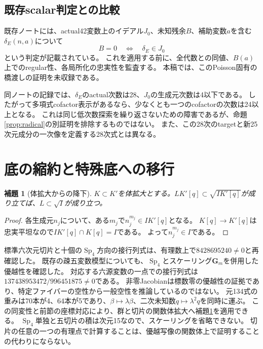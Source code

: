 \documentclass[a4paper,11pt]{ltjsarticle}
\newtheorem{lemma}[proposition]{補題}
\theoremstyle{definition}
\newcommand{\Sp}{\operatorname{Sp}}
\begin{document}
\subsection{既存scalar判定との比較}
既存ノートには、actual42変数上のイデアル\(J_0\)、未知残余\(B\)、補助変数\(a\)を含む\(\delta_E(n,a)\)について
\[
 B=0\quad\Longleftrightarrow\quad\delta_E\in J_0
\]
という判定が記載されている。
これを適用する前に、全代数との同値、\(B(a)\)上でのregular性、各局所化の忠実性を監査する。
本稿では、このPoisson固有の橋渡しの証明を未収録である。

同ノートの記録では、\(\delta_E\)のactual次数は28、\(J_0\)の生成元次数は4以下である。
したがって多項式cofactor表示があるなら、少なくとも一つのcofactorの次数は24以上となる。
これは同じ低次数探索を繰り返さないための障害であるが、命題\ref{prop:radical}の別証明を排除するものではない。
また、この28次のtargetと新25次元成分の一次像を定義する28次式とは異なる。

\section{底の縮約と特殊底への移行}
\begin{lemma}[体拡大からの降下]\label{lem:descent}
\(K\subset K'\)を体拡大とする。\(L K'[q]\subset\sqrt{I K'[q]}\)が成り立てば、\(L\subset\sqrt I\)が成り立つ。
\end{lemma}
\begin{proof}
各生成元\(n_j\)について、ある\(m_j\)で\(n_j^{m_j}\in I K'[q]\)となる。
\(K[q]\to K'[q]\)は忠実平坦なので\(I K'[q]\cap K[q]=I\)である。
よって\(n_j^{m_j}\in I\)である。
\end{proof}

標準六次元切片と十個の\(\Sp_4\)方向の接行列式は、有理数上で\(8428695240\ne0\)と再確認した。
既存の疎五変数模型についても、\(\Sp_4\)とスケーリング\(\mathbf G_m\)を併用した優越性を確認した。
対応する六源変数の一点での接行列式は\(137438953472/996451875\ne0\)である。
非零Jacobianは標数零の優越性の証拠であり、特定ファイバーの空性から一般空性を推論しているのではない。
元134式の重みは70本が4、64本が5であり、\(\beta\mapsto\lambda\beta\)、二次未知数\(q\mapsto\lambda^2q\)を同時に運ぶ。
この同変性と前節の座標対応により、群と切片の関数体拡大へ補題\ref{lem:descent}を適用できる。
\(\Sp_4\)単独と五切片の積は次元15なので、スケーリングを省略できない。
切片の任意の一つの有理点で計算することは、優越写像の関数体上で証明することの代わりにならない。
\end{document}
